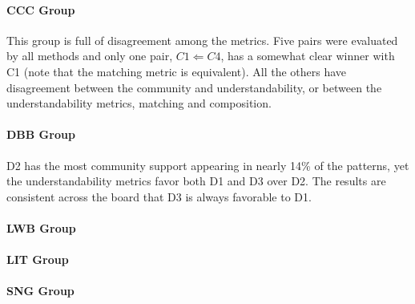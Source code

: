 







\paragraph{CCC Group}
This group is full of disagreement among the metrics. Five pairs were evaluated by all methods and only one pair, $C1 \Leftarrow C4$, has a somewhat clear winner with C1 (note that the matching metric is equivalent). All the others have disagreement between the community and understandability, or between the understandability metrics, matching and composition.


\paragraph{DBB Group}
D2 has the most community support appearing in nearly 14\% of the patterns, yet the understandability metrics favor both D1 and D3 over D2. The results are consistent across the board that D3 is always favorable to D1.

\paragraph{LWB Group}

\paragraph{LIT Group}

\paragraph{SNG Group}





